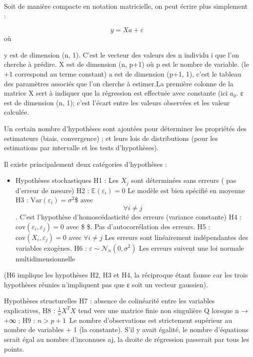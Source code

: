 \documentclass[
]{book}
\providecommand{\tightlist}{%
  \setlength{\itemsep}{0pt}\setlength{\parskip}{0pt}}
\begin{document}
Soit de manière compacte en notation matricielle, on peut écrire plus simplement :

\[y=Xa+\varepsilon\]
où

y est de dimension (n, 1). C'est le vecteur des valeurs des n individu i que l'on cherche à prédire.
X est de dimension (n, p+1) où p est le nombre de variable. (le +1 correspond au terme constant)
a est de dimension (p+1, 1), c'est le tableau des paramètres associés que l'on cherche à estimer.La première colonne de la matrice X sert à indiquer que la régression est effectuée avec constante (ici \(a_{0}\).
ε est de dimension (n, 1); c'est l'écart entre les valeurs observées et les valeur calculée.

Un certain nombre d'hypothèses sont ajoutées pour déterminer les propriétés des estimateurs (biais, convergence) ; et leurs lois de distributions (pour les estimations par intervalle et les tests d'hypothèses).

Il existe principalement deux catégories d'hypothèses :

\begin{itemize}
\tightlist
\item
  Hypothèses stochastiques
  H1 : Les \(X_j\) sont déterminées sans erreurs ( pas d'erreur de mesure)
  H2 : \({\mathbb{E}(\varepsilon_{i})=0}\) Le modèle est bien spécifié en moyenne
  H3 : \({\text{Var}(\varepsilon_{i})}=\sigma^{2}\)\$ avec \[\forall{i}\ne{j} \]. C'est l'hypothèse d'homoscédasticité des erreurs (variance constante)
  H4 : \({\mathrm{cov}(\varepsilon _{i},\varepsilon _{j})}=0\) avec \$ \$. Pas d'autocorrélation des erreurs.
  H5 : \({\mathrm {cov} (X_{i},\varepsilon _{j})}=0\) avec \(\forall{i}\ne{j}\) Les erreurs sont linéairement indépendantes des variables exogènes.
  H6 : \(\varepsilon\sim{\mathcal{N}}_{n}(0,\sigma^{2})\) Les erreurs suivent une loi normale multidimensionnelle
\end{itemize}

(H6 implique les hypothèses H2, H3 et H4, la réciproque étant fausse car les trois hypothèses réunies n'impliquent pas que ε soit un vecteur gaussien).

Hypothèses structurelles
H7 : absence de colinéarité entre les variables explicatives,
H8 : \({{\frac {1}{n}}X^{T}X}\) tend vers une matrice finie non singulière Q lorsque n → +∞ ;
H9 : \({n>p+1\,}\) Le nombre d'observations est strictement supérieur au nombre de variables + 1 (la constante). S'il y avait égalité, le nombre d'équations serait égal au nombre d'inconnues aj, la droite de régression passerait par tous les points.
\end{document}
